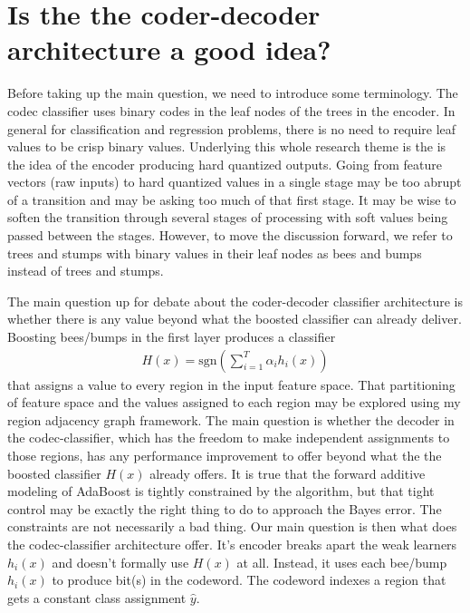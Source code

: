 \documentclass{article}
\begin{document}
\section{Is the the coder-decoder architecture a good idea?}
Before taking up the main question, we need to introduce some terminology.  The codec classifier uses binary codes in the leaf nodes of the trees in the encoder.  In general for classification and regression problems, there is no need to require leaf values to be crisp binary values.  Underlying this whole research theme is the is the idea of the encoder producing hard quantized outputs.  Going from feature vectors (raw inputs) to hard quantized values in a single stage may be too abrupt of a transition and may be asking too much of that first stage.  It may be wise to soften the transition through several stages of processing with soft values being passed between the stages.  However, to move the discussion forward, we refer to trees and stumps with binary values in their leaf nodes as bees and bumps instead of trees and stumps.

The main question up for debate about the coder-decoder classifier architecture is whether there is any value beyond what the boosted classifier can already deliver.  Boosting bees/bumps in the first layer produces a classifier
\begin{gather*}
H(x) = \text{sgn}\left( \sum_{i=1}^T \alpha_i h_i(x)\right)
\end{gather*}
that assigns a value to every region in the input feature space.  That partitioning of feature space and the values assigned to each region may be explored using my region adjacency graph framework.  The main question is whether the decoder in the codec-classifier, which has the freedom to make independent assignments to those regions, has any performance improvement to offer beyond what the the boosted classifier $H(x)$ already offers.  It is true that the forward additive modeling of AdaBoost is tightly constrained by the algorithm, but that tight control may be exactly the right thing to do to approach the Bayes error.  The constraints are not necessarily a bad thing.  Our main question is then what does the codec-classifier architecture offer.  It's encoder breaks apart the weak learners $h_i(x)$ and doesn't formally use $H(x)$ at all.  Instead, it uses each bee/bump $h_i(x)$ to produce bit(s) in the codeword.  The codeword indexes a region that gets a constant class assignment $\hat{y}$.
\end{document}
